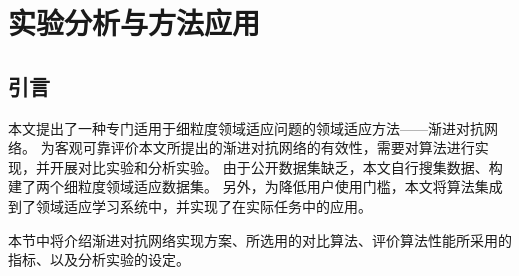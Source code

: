 
\chapter{实验分析与方法应用}

\section{引言}
\label{exp.intro}

本文提出了一种专门适用于细粒度领域适应问题的领域适应方法——渐进对抗网络。
为客观可靠评价本文所提出的渐进对抗网络的有效性，需要对算法进行实现，并开展对比实验和分析实验。
由于公开数据集缺乏，本文自行搜集数据、构建了两个细粒度领域适应数据集。
另外，为降低用户使用门槛，本文将算法集成到了领域适应学习系统中，并实现了在实际任务中的应用。

本节中将介绍渐进对抗网络实现方案、所选用的对比算法、评价算法性能所采用的指标、以及分析实验的设定。







